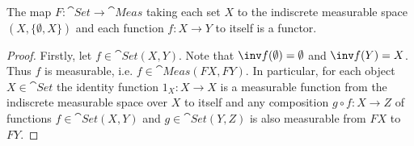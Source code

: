 \documentclass{article}
\begin{document}
\begin{claim*}
	The map $F:\cat{Set}\to\cat{Meas}$ taking each set $X$ to the indiscrete measurable space
	$(X,\{\emptyset, X\})$ and each function $f:X\to Y$ to itself is a functor.
	\begin{proof}
		Firstly, let $f\in\cat{Set}(X,Y)$. Note that $\inv f(\emptyset)=\emptyset$ and
		$\inv f(Y)=X$. Thus $f$ is measurable, i.e. $f\in\cat{Meas}(FX, FY)$.
		In particular, for each object $X\in\cat{Set}$ the identity function $1_X:X\to X$ is a measurable
		function from the indiscrete measurable space over $X$ to itself and any composition $g\circ f:X\to Z$
		of functions $f\in\cat{Set}(X,Y)$ and $g\in\cat{Set}(Y,Z)$ is also measurable from $FX$ to $FY$.
	\end{proof}
\end{claim*}
\end{document}
